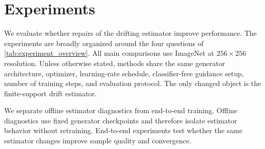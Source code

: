 \documentclass{article}
\begin{document}

\section{Experiments}
\label{sec:experiments}

We evaluate whether repairs of the drifting estimator improve performance. The experiments are broadly organized around the four questions of \cref{tab:experiment_overview}. All main comparisons use ImageNet at $256\times256$ resolution.
Unless otherwise stated, methods share the same generator architecture, optimizer, learning-rate schedule, classifier-free guidance setup, number of training steps, and evaluation protocol.
The only changed object is the finite-support drift estimator.

We separate offline estimator diagnostics from end-to-end training. Offline diagnostics use fixed generator checkpoints and therefore isolate estimator behavior without retraining.
End-to-end experiments test whether the same estimator changes improve sample quality and convergence.

\newcommand{\rowheight}[1]{\parbox[c][2.3\normalbaselineskip][c]{\linewidth}{#1}}
\end{document}

